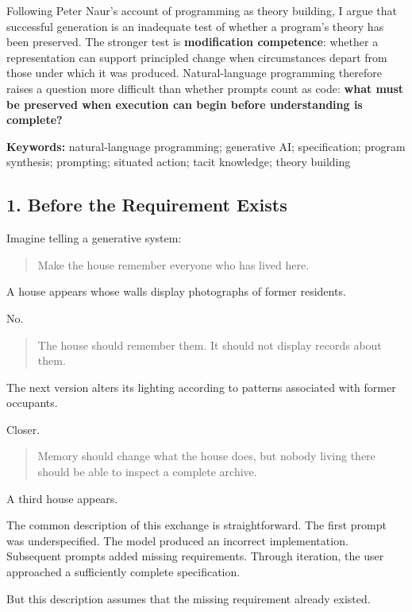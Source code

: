 \documentclass[
]{article}
\begin{document}
Following Peter Naur's account of programming as theory building, I
argue that successful generation is an inadequate test of whether a
program's theory has been preserved. The stronger test is
\textbf{modification competence}: whether a representation can support
principled change when circumstances depart from those under which it
was produced. Natural-language programming therefore raises a question
more difficult than whether prompts count as code: \textbf{what must be
preserved when execution can begin before understanding is complete?}

\textbf{Keywords:} natural-language programming; generative AI;
specification; program synthesis; prompting; situated action; tacit
knowledge; theory building

\subsection{1. Before the Requirement
Exists}\label{before-the-requirement-exists}

Imagine telling a generative system:

\begin{quote}
Make the house remember everyone who has lived here.
\end{quote}

A house appears whose walls display photographs of former residents.

No.

\begin{quote}
The house should remember them. It should not display records about
them.
\end{quote}

The next version alters its lighting according to patterns associated
with former occupants.

Closer.

\begin{quote}
Memory should change what the house does, but nobody living there should
be able to inspect a complete archive.
\end{quote}

A third house appears.

The common description of this exchange is straightforward. The first
prompt was underspecified. The model produced an incorrect
implementation. Subsequent prompts added missing requirements. Through
iteration, the user approached a sufficiently complete specification.

But this description assumes that the missing requirement already
existed.
\end{document}
